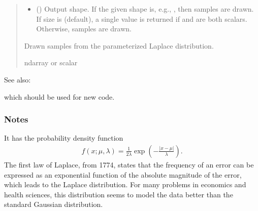 \documentclass[letterpaper,10pt,english]{sphinxmanual}
\begin{document}
\begin{fulllineitems}
\begin{quote}
\begin{description}
\begin{itemize}
\item {} 
\sphinxAtStartPar
{} (\sphinxstyleliteralemphasis{\sphinxupquote{, }}) \textendash{} Output shape.  If the given shape is, e.g., , then
 samples are drawn.  If size is  (default),
a single value is returned if  and  are both scalars.
Otherwise,  samples are drawn.

\end{itemize}

\sphinxAtStartPar
{} \textendash{} Drawn samples from the parameterized Laplace distribution.

\sphinxAtStartPar
ndarray or scalar

\end{description}\end{quote}


\begin{sphinxseealso}{See also:}
\begin{description}
\sphinxAtStartPar
which should be used for new code.

\end{description}


\end{sphinxseealso}

\subsubsection*{Notes}

\sphinxAtStartPar
It has the probability density function
\begin{equation*}
\begin{split}f(x; \mu, \lambda) = \frac{1}{2\lambda}
\exp\left(-\frac{|x - \mu|}{\lambda}\right).\end{split}
\end{equation*}
\sphinxAtStartPar
The first law of Laplace, from 1774, states that the frequency
of an error can be expressed as an exponential function of the
absolute magnitude of the error, which leads to the Laplace
distribution. For many problems in economics and health
sciences, this distribution seems to model the data better
than the standard Gaussian distribution.

\end{fulllineitems}
\end{document}
